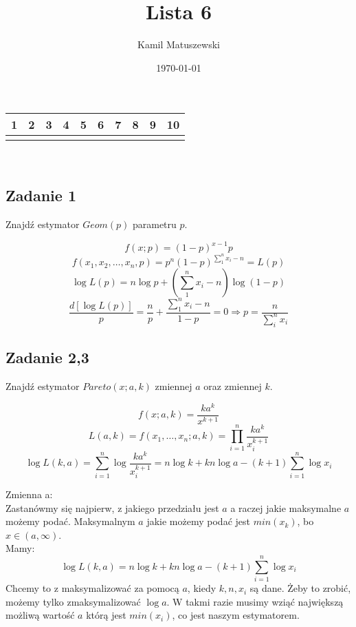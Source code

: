 \documentclass[a4paper]{article}
\title{Lista 6}
\author{Kamil Matuszewski}
\date{\today}
\begin{document}
\maketitle
\setlength{\parindent}{0.5ex}
\setlength{\parskip}{1.5ex}
\newcommand{\R}{\mathbb{R}}
\newcommand{\N}{\mathbb{N}}


\begin{center}
\begin{tabular}{|c *{8}{|c} |c|} & 2 & 3 & 4 & 5 & 6 & 7 & 8 & 9 & 10\\
\hline 
 & & & & & & & & &\\
\hline
\end{tabular}\\
\end{center}

\subsection*{Zadanie 1}
Znajdź estymator $Geom(p)$ parametru $p$.

$$f(x;p)=(1-p)^{x-1}p$$
$$f(x_1,x_2,\dots ,x_n, p)=p^n(1-p)^{\sum_1^n x_i - n} = L(p)$$
$$\log{L(p)} = n\log{p} + \left( \sum\limits_1^n x_i - n\right) \log{(1-p)} $$
$$ \frac{d[\log{L(p)}]}{p} = \frac{n}{p} + \frac{\sum_1^n x_i - n}{1-p} = 0 \Rightarrow p=\frac{n}{\sum_i^n x_i}$$

\subsection*{Zadanie 2,3}
Znajdź estymator $Pareto(x;a,k)$ zmiennej $a$ oraz zmiennej $k$.

$$f(x;a,k)=\frac{ka^k}{x^{k+1}}$$
$$L(a,k)=f(x_1,\dots ,x_n;a,k)=\prod\limits_{i=1}^n \frac{ka^k}{x_i^{k+1}}$$
$$\log{L(k,a)}=\sum\limits_{i=1}^n \log{\frac{k a^k}{x_i^{k + 1}}}=n\log{k} + k n \log{a} - (k+1)  \sum\limits_{i=1}^n \log{x_i}$$


Zmienna a:\\
Zastanówmy się najpierw, z jakiego przedziału jest $a$ a raczej jakie maksymalne $a$ możemy podać. Maksymalnym $a$ jakie możemy podać jest $min(x_k)$, bo $x\in (a,\infty)$.\\
Mamy:
$$\log{L(k,a)}= n\log{k} + k n \log{a} - (k+1)  \sum\limits_{i=1}^n \log{x_i}$$
Chcemy to z maksymalizować za pomocą $a$, kiedy $k,n,x_i$ są dane. Żeby to zrobić, możemy tylko zmaksymalizować $\log{a}$. W takmi razie musimy wziąć największą możliwą wartość $a$ którą jest $min(x_i)$, co jest naszym estymatorem.
\end{document}
